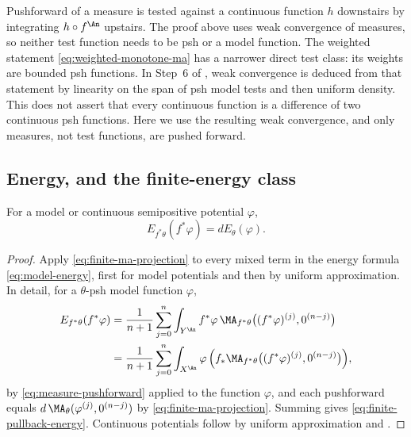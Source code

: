 \begin{remark}
\label{rem:ch30-test-function}
Pushforward of a measure is tested against a continuous function \(h\)
downstairs by integrating \(h\circ f^{\An}\) upstairs.  The proof above
uses weak convergence of measures, so neither test function needs to be
psh or a model function.  The weighted statement
\eqref{eq:weighted-monotone-ma} has a narrower direct test class: its
weights are bounded psh functions.  In Step~6 of
, weak convergence is deduced from that
statement by linearity on the span of psh model tests and then uniform
density.  This does not assert that every continuous function is a
difference of two continuous psh functions.  Here we use the resulting
weak convergence, and only measures, not test functions, are pushed
forward.
\end{remark}

\subsection{Energy, and the finite-energy class}
\label{sec:ch30-finite-energy}

\begin{corollary}\label{cor:finite-pullback-energy}
For a model or continuous semipositive potential \(\varphi\),
\begin{equation}
\label{eq:finite-pullback-energy}
               E_{f^*\theta}(f^*\varphi)
               =dE_\theta(\varphi).
\end{equation}
\end{corollary}

\begin{proof}
Apply \eqref{eq:finite-ma-projection} to every mixed term in the energy
formula \eqref{eq:model-energy}, first for model potentials and then by
uniform approximation.  In detail, for a \(\theta\)-psh model function
\(\varphi\),
\[
\begin{aligned}
 E_{f^*\theta}(f^*\varphi)
 &=\frac1{n+1}\sum_{j=0}^n\int_{Y^{\An}}f^*\varphi\,
    \MA_{f^*\theta}\bigl((f^*\varphi)^{(j)},0^{(n-j)}\bigr)\\
 &=\frac1{n+1}\sum_{j=0}^n\int_{X^{\An}}\varphi\,
    \Bigl(f_*\MA_{f^*\theta}\bigl((f^*\varphi)^{(j)},0^{(n-j)}\bigr)\Bigr),
\end{aligned}
\]
by \eqref{eq:measure-pushforward} applied to the function \(\varphi\), and
each pushforward equals \(d\,\MA_\theta(\varphi^{(j)},0^{(n-j)})\) by
\eqref{eq:finite-ma-projection}.  Summing gives
\eqref{eq:finite-pullback-energy}.  Continuous potentials follow by uniform
approximation and .
\end{proof}

